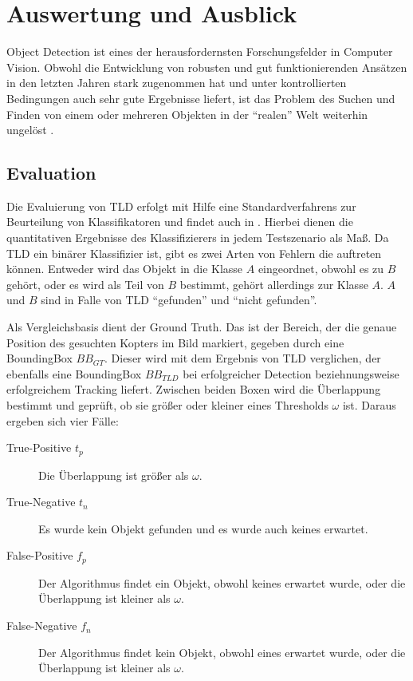 \section{Auswertung und Ausblick}
Object Detection ist eines der herausfordernsten Forschungsfelder in Computer Vision. Obwohl die Entwicklung von robusten und gut funktionierenden Ansätzen in den letzten Jahren stark zugenommen hat und unter kontrollierten Bedingungen auch sehr gute Ergebnisse liefert, ist das Problem des Suchen und Finden von einem oder mehreren Objekten in der ``realen'' Welt weiterhin ungelöst \cite{ODS}.

\subsection{Evaluation}
	Die Evaluierung von TLD erfolgt mit Hilfe eine Standardverfahrens zur Beurteilung von Klassifikatoren und findet auch in \cite{TLD}. Hierbei dienen die quantitativen Ergebnisse des Klassifizierers in jedem Testszenario als Maß. Da TLD ein binärer Klassifizier ist, gibt es zwei Arten von Fehlern die auftreten können. Entweder wird das Objekt in die Klasse $A$ eingeordnet, obwohl es zu $B$ gehört, oder es wird als Teil von $B$ bestimmt, gehört allerdings zur Klasse $A$. $A$ und $B$ sind in Falle von TLD ``gefunden'' und ``nicht gefunden''.
	
	Als Vergleichsbasis dient der Ground Truth. Das ist der Bereich, der die genaue Position des gesuchten Kopters im Bild markiert, gegeben durch eine BoundingBox $BB_{GT}$. Dieser wird mit dem Ergebnis von TLD verglichen, der ebenfalls eine BoundingBox $BB_{TLD}$ bei erfolgreicher Detection beziehnungsweise erfolgreichem Tracking liefert. Zwischen beiden Boxen wird die Überlappung bestimmt und geprüft, ob sie größer oder kleiner eines Thresholds $\omega$ ist. Daraus ergeben sich vier Fälle:

	\begin{description}
	\item [True-Positive $t_p$] Die Überlappung ist größer als $\omega$.
	\item [True-Negative $t_n$] Es wurde kein Objekt gefunden und es wurde auch keines erwartet.
	\item [False-Positive $f_p$] Der Algorithmus findet ein Objekt, obwohl keines erwartet wurde, oder die Überlappung ist kleiner als $\omega$.
	\item [False-Negative $f_n$] Der Algorithmus findet kein Objekt, obwohl eines erwartet wurde, oder die Überlappung ist kleiner als $\omega$.
	\end{description}

